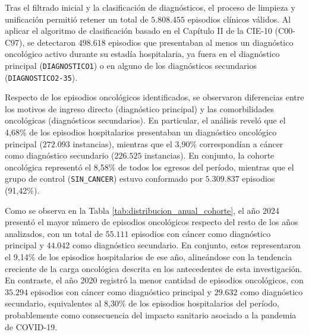 Tras el filtrado inicial y la clasificación de diagnósticos, el proceso de limpieza y unificación permitió retener un total de $5.808.455$ episodios clínicos válidos. Al aplicar el algoritmo de clasificación basado en el Capítulo II de la CIE-10 (C00-C97), se detectaron $498.618$ episodios que presentaban al menos un diagnóstico oncológico activo durante su estadía hospitalaria, ya fuera en el diagnóstico principal (\texttt{DIAGNOSTICO1}) o en alguno de los diagnósticos secundarios (\texttt{DIAGNOSTICO2-35}).

Respecto de los episodios oncológicos identificados, se observaron diferencias entre los motivos de ingreso directo (diagnóstico principal) y las comorbilidades oncológicas (diagnósticos secundarios). En particular, el análisis reveló que el 4,68\% de los episodios hospitalarios presentaban un diagnóstico oncológico principal ($272.093$ instancias), mientras que el 3,90\% correspondían a cáncer como diagnóstico secundario ($226.525$ instancias). En conjunto, la cohorte oncológica representó el 8,58\% de todos los egresos del período, mientras que el grupo de control (\texttt{SIN\_CANCER}) estuvo conformado por $5.309.837$ episodios (91,42\%).

Como se observa en la Tabla \ref{tab:distribucion_anual_cohorte}, el año 2024 presentó el mayor número de episodios oncológicos respecto del resto de los años analizados, con un total de $55.111$ episodios con cáncer como diagnóstico principal y $44.042$ como diagnóstico secundario. En conjunto, estos representaron el 9,14\% de los episodios hospitalarios de ese año, alineándose con la tendencia creciente de la carga oncológica descrita en los antecedentes de esta investigación. En contraste, el año 2020 registró la menor cantidad de episodios oncológicos, con $35.294$ episodios con cáncer como diagnóstico principal y $29.632$ como diagnóstico secundario, equivalentes al 8,30\% de los episodios hospitalarios del período, probablemente como consecuencia del impacto sanitario asociado a la pandemia de COVID-19.

